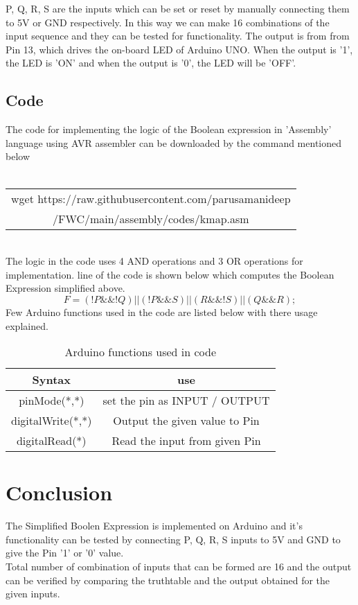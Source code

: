 \documentclass[journal,12pt,twocolumn]{IEEEtran}
\begin{document}
P, Q, R, S are the inputs which can be set or reset by manually connecting them to 5V or GND respectively. In this way we can make 16 combinations of the input sequence and they can be tested for functionality.
The output is from from Pin 13, which drives the on-board LED of Arduino UNO. When the output is '1', the LED is 'ON' and when the output is '0', the LED will be 'OFF'.\\
 
\subsection{Code}
The code for implementing the logic of the Boolean expression in 'Assembly' language using AVR assembler can be downloaded by the command mentioned below \\ \\
\begin{tabular}{|c|}
    \hline
wget https://raw.githubusercontent.com/parusamanideep
\\/FWC/main/assembly/codes/kmap.asm\\
     \hline
\end{tabular}\\

\bigskip
The logic in the code uses 4 AND operations and 3 OR operations for implementation. line of the code is shown below which computes the Boolean Expression simplified above.
$$ F = (!P\&\&!Q) || (!P\&\&S) || (R\&\&!S) || (Q\&\&R); $$
Few Arduino functions used in the code are listed below with there usage explained.\\

\begin{table}[h]
\centering
\begin{tabular}{|c|c|}
\hline
Syntax & use\\
\hline
pinMode(*,*)& set the pin as INPUT / OUTPUT\\
\hline
digitalWrite(*,*)& Output the given value to Pin\\
\hline
digitalRead(*)& Read the input from given Pin\\
\hline 
\end{tabular}
\bigskip
\caption{Arduino functions used in code} 
\end{table}  

\section{Conclusion}
The Simplified Boolen Expression is implemented on Arduino and it's functionality can be tested by connecting P, Q, R, S inputs to 5V and GND to give the Pin '1' or '0' value.\\
Total number of combination of inputs that can be formed are 16 and the output can be verified by comparing the truthtable and the output obtained for the given inputs.
\end{document}
